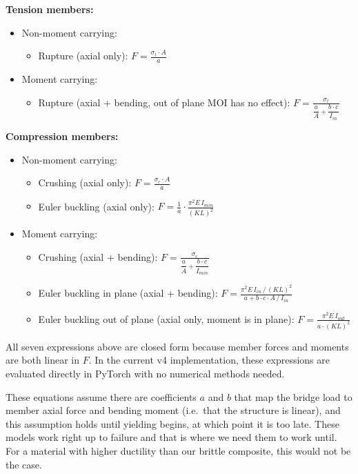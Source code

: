 \documentclass[11pt]{article}
\begin{document}
\medskip
\noindent\textbf{Tension members:}
\begin{itemize}
  \item Non-moment carrying:
  \begin{itemize}
    \item Rupture (axial only): $\displaystyle F = \frac{\sigma_t \cdot A}{a}$
  \end{itemize}
  \item Moment carrying:
  \begin{itemize}
    \item Rupture (axial + bending, out of plane MOI has no effect): $\displaystyle F = \frac{\sigma_t}{\dfrac{a}{A} + \dfrac{b \cdot c}{I_{in}}}$
  \end{itemize}
\end{itemize}

\medskip
\noindent\textbf{Compression members:}
\begin{itemize}
  \item Non-moment carrying:
  \begin{itemize}
    \item Crushing (axial only): $\displaystyle F = \frac{\sigma_c \cdot A}{a}$
    \item Euler buckling (axial only): $\displaystyle F = \frac{1}{a} \cdot \frac{\pi^2 E\,I_{min}}{(KL)^2}$
  \end{itemize}
  \item Moment carrying:
  \begin{itemize}
    \item Crushing (axial + bending): $\displaystyle F = \frac{\sigma_c}{\dfrac{a}{A} + \dfrac{b \cdot c}{I_{min}}}$
    \item Euler buckling in plane (axial + bending): $\displaystyle F = \frac{\pi^2 E\,I_{in}\,/\,(KL)^2}{a + b \cdot c \cdot A\,/\,I_{in}}$
    \item Euler buckling out of plane (axial only, moment is in plane): $\displaystyle F = \frac{\pi^2 E\,I_{out}}{a\cdot (KL)^2}$
  \end{itemize}
\end{itemize}

\medskip
\noindent
All seven expressions above are closed form because member forces and moments are both linear in $F$.
In the current v4 implementation, these expressions are evaluated
directly in PyTorch with no numerical methods needed.

These equations assume there are coefficients $a$ and $b$ that map the bridge load to member axial force and bending moment (i.e.\ that the structure is linear), and this assumption holds until yielding begins, at which point it is too late. These models work right up to failure and that is where we need them to work until. For a material with higher ductility than our brittle composite, this would not be the case.
\end{document}
